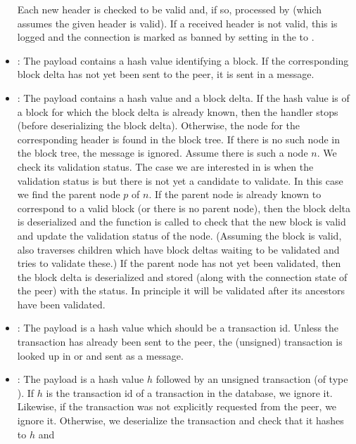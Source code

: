 \begin{itemize}
Each new header is checked to be valid and, if so, processed by {} (which assumes the given header is valid).
If a received header is not valid, this is logged and the connection is marked as banned by setting {} in the {} to {}.
\item {}: The payload contains a hash value identifying a block.
If the corresponding block delta has not yet been sent to the peer, it is sent in a {} message.
\item {}: The payload contains a hash value and a block delta.
If the hash value is of a block for which the block delta is already known, then
the handler stops (before deserializing the block delta).
Otherwise, the node for the corresponding header is found in the block tree.
If there is no such node in the block tree, the message is ignored.
Assume there is such a node $n$.
We check its validation status.
The case we are interested in is when the validation status is {}
but there is not yet a candidate {} to validate.
In this case we find the parent node $p$ of $n$.
If the parent node is already known to correspond to a valid block (or there is no parent node),
then the block delta is deserialized
and the function {} is called to check
that the new block is valid and update the validation status of the node.
(Assuming the block is valid, {} also traverses children
which have block deltas waiting to be validated and tries to validate these.)
If the parent node has not yet been validated,
then the block delta is deserialized and stored (along with the connection state of the peer)
with the {} status. In principle it will be validated after its ancestors
have been validated.
\item {}: The payload is a hash value which should be a transaction id.
Unless the transaction has already been sent to the peer, the (unsigned) transaction
is looked up in {} or {} and sent as a {} message.
\item {}: The payload is a hash value $h$ followed by an unsigned transaction (of type {}).
If $h$ is the transaction id of a transaction in the {} database, we ignore it.
Likewise, if the transaction was not explicitly requested from the peer, we ignore it.
Otherwise, we deserialize the transaction and check that it hashes to $h$ and

\end{itemize}
